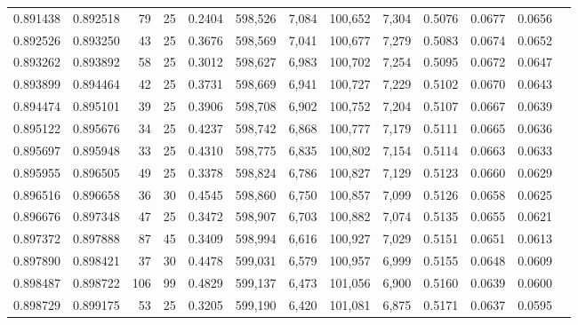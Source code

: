 \begin{tabular}{rrrrrrrrrrrrr}
0.891438 & 0.892518 &    79 &  25 &                                     0.2404 & 598,526 &   7,084 & 100,652 &   7,304 & 0.5076 & 0.0677 & 0.0656 \\
0.892526 & 0.893250 &    43 &  25 &                                     0.3676 & 598,569 &   7,041 & 100,677 &   7,279 & 0.5083 & 0.0674 & 0.0652 \\
0.893262 & 0.893892 &    58 &  25 &                                     0.3012 & 598,627 &   6,983 & 100,702 &   7,254 & 0.5095 & 0.0672 & 0.0647 \\
0.893899 & 0.894464 &    42 &  25 &                                     0.3731 & 598,669 &   6,941 & 100,727 &   7,229 & 0.5102 & 0.0670 & 0.0643 \\
0.894474 & 0.895101 &    39 &  25 &                                     0.3906 & 598,708 &   6,902 & 100,752 &   7,204 & 0.5107 & 0.0667 & 0.0639 \\
0.895122 & 0.895676 &    34 &  25 &                                     0.4237 & 598,742 &   6,868 & 100,777 &   7,179 & 0.5111 & 0.0665 & 0.0636 \\
0.895697 & 0.895948 &    33 &  25 &                                     0.4310 & 598,775 &   6,835 & 100,802 &   7,154 & 0.5114 & 0.0663 & 0.0633 \\
0.895955 & 0.896505 &    49 &  25 &                                     0.3378 & 598,824 &   6,786 & 100,827 &   7,129 & 0.5123 & 0.0660 & 0.0629 \\
0.896516 & 0.896658 &    36 &  30 &                                     0.4545 & 598,860 &   6,750 & 100,857 &   7,099 & 0.5126 & 0.0658 & 0.0625 \\
0.896676 & 0.897348 &    47 &  25 &                                     0.3472 & 598,907 &   6,703 & 100,882 &   7,074 & 0.5135 & 0.0655 & 0.0621 \\
0.897372 & 0.897888 &    87 &  45 &                                     0.3409 & 598,994 &   6,616 & 100,927 &   7,029 & 0.5151 & 0.0651 & 0.0613 \\
0.897890 & 0.898421 &    37 &  30 &                                     0.4478 & 599,031 &   6,579 & 100,957 &   6,999 & 0.5155 & 0.0648 & 0.0609 \\
0.898487 & 0.898722 &   106 &  99 &                                     0.4829 & 599,137 &   6,473 & 101,056 &   6,900 & 0.5160 & 0.0639 & 0.0600 \\
0.898729 & 0.899175 &    53 &  25 &                                     0.3205 & 599,190 &   6,420 & 101,081 &   6,875 & 0.5171 & 0.0637 & 0.0595 \\

\end{tabular}
